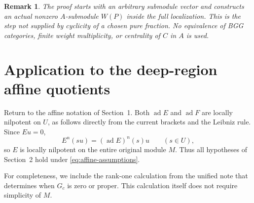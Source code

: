 \documentclass[11pt,a4paper]{article}
\newcommand{\ad}{\operatorname{ad}}
\theoremstyle{plainupright}
\newtheorem{remark}[theorem]{Remark}
\begin{document}
\begin{remark}
The proof starts with an arbitrary submodule vector and constructs an
actual nonzero \(A\)-submodule \(W(P)\) inside the full localization.
This is the step not supplied by cyclicity of a chosen pure fraction.
No equivalence of BGG categories, finite weight multiplicity, or
centrality of \(C\) in \(A\) is used.
\end{remark}

\section{Application to the deep-region affine quotients}

Return to the affine notation of Section~1.
Both \(\ad E\) and \(\ad F\) are locally nilpotent on \(U\), as follows
directly from the current brackets and the Leibniz rule.
Since \(Eu=0\),
\[
E^n(su)=(\ad E)^n(s)u\qquad(s\in U),
\]
so \(E\) is locally nilpotent on the entire original module \(M\).
Thus all hypotheses of Section~2 hold under
\eqref{eq:affine-assumptions}.

For completeness, we include the rank-one calculation from the
unified note that determines when \(G_c\) is zero or proper.
This calculation itself does not require simplicity of \(M\).
\end{document}
